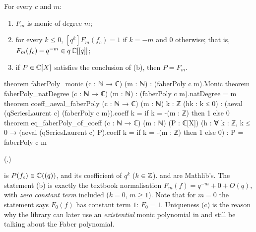 \begin{theorem}\label{ch19:thm:faber}
For every $c$ and $m$:
\begin{enumerate}[label=(\alph*)]
\item $F_m$ is monic of degree $m$;
\item for every $k\le0$, $[q^k]F_m(f_c)=1$ if $k=-m$ and $0$ otherwise; that is, $F_m(f_c)-q^{-m}\in q\,{\mathbb{C}}[[q]]$;
\item if $P\in{\mathbb{C}}[X]$ satisfies the conclusion of (b), then $P=F_m$.
\end{enumerate}
\end{theorem}
\begin{leancode}
theorem faberPoly_monic (c : ℕ → ℂ) (m : ℕ) : (faberPoly c m).Monic
theorem faberPoly_natDegree (c : ℕ → ℂ) (m : ℕ) : (faberPoly c m).natDegree = m
theorem coeff_aeval_faberPoly (c : ℕ → ℂ) (m : ℕ) {k : ℤ} (hk : k ≤ 0) :
    (aeval (qSeriesLaurent c) (faberPoly c m)).coeff k = if k = -(m : ℤ) then 1 else 0
theorem eq_faberPoly_of_coeff (c : ℕ → ℂ) (m : ℕ) (P : ℂ[X])
    (h : ∀ k : ℤ, k ≤ 0 → (aeval (qSeriesLaurent c) P).coeff k = if k = -(m : ℤ) then 1 else 0) :
    P = faberPoly c m
\end{leancode}
(.)
\begin{dictionary}
 is $P(f_c)\in{\mathbb{C}}((q))$, and  its coefficient of $q^k$
($k\in{\mathbb{Z}}$).   and  are Mathlib's.  The statement (b) is exactly the textbook normalisation
$F_m(f)=q^{-m}+0+O(q)$, with \emph{zero constant term} included ($k=0$, $m\ge1$).  Note that for $m=0$ the
statement says $F_0(f)$ has constant term $1$: $F_0=1$.  Uniqueness (c) is the reason why the library can later use an
\emph{existential} monic polynomial in  and still be talking about the Faber polynomial.
\end{dictionary}
